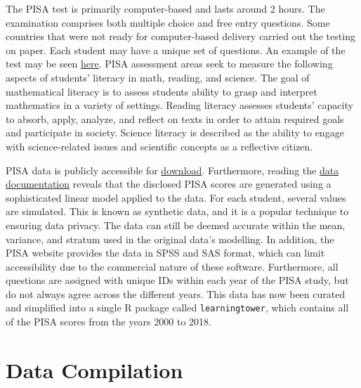 The PISA test is primarily computer-based and lasts around 2 hours. The
examination comprises both multiple choice and free entry questions.
Some countries that were not ready for computer-based delivery carried
out the testing on paper. Each student may have a unique set of
questions. An example of the test may be seen
\href{https://www.oecd.org/pisa/test/}{here}. PISA assessment areas seek
to measure the following aspects of students' literacy in math, reading,
and science. The goal of mathematical literacy is to assess students
ability to grasp and interpret mathematics in a variety of settings.
Reading literacy assesses students' capacity to absorb, apply, analyze,
and reflect on texts in order to attain required goals and participate
in society. Science literacy is described as the ability to engage with
science-related issues and scientific concepts as a reflective citizen.

PISA data is publicly accessible for
\href{https://www.oecd.org/pisa/data/}{download}. Furthermore, reading
the
\href{https://www.oecd.org/pisa/data/pisa2018technicalreport/Ch.09-Scaling-PISA-Data.pdf}{data
documentation} reveals that the disclosed PISA scores are generated
using a sophisticated linear model applied to the data. For each
student, several values are simulated. This is known as synthetic data,
and it is a popular technique to ensuring data privacy. The data can
still be deemed accurate within the mean, variance, and stratum used in
the original data's modelling. In addition, the PISA website provides
the data in SPSS and SAS format, which can limit accessibility due to
the commercial nature of these software. Furthermore, all questions are
assigned with unique IDs within each year of the PISA study, but do not
always agree across the different years. This data has now been curated
and simplified into a single R package called \texttt{learningtower},
which contains all of the PISA scores from the years 2000 to 2018.

\hypertarget{data-compilation}{%
\section{Data Compilation}\label{data-compilation}}

